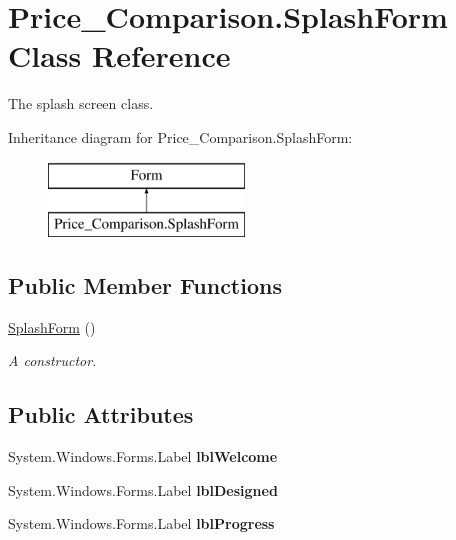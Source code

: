 \hypertarget{class_price___comparison_1_1_splash_form}{\section{Price\-\_\-\-Comparison.\-Splash\-Form Class Reference}
\label{class_price___comparison_1_1_splash_form}
}


The splash screen class.  


Inheritance diagram for Price\-\_\-\-Comparison.\-Splash\-Form\-:\begin{figure}[H]
\begin{center}
\leavevmode
\includegraphics[height=2.000000cm]{class_price___comparison_1_1_splash_form}
\end{center}
\end{figure}
\subsection*{Public Member Functions}
\begin{DoxyCompactItemize}
\item 
\hyperlink{class_price___comparison_1_1_splash_form_a401a198b0d83eb8f0cb23b44c28a7947}{Splash\-Form} ()
\begin{DoxyCompactList}\small\item\em A constructor. \end{DoxyCompactList}\end{DoxyCompactItemize}
\subsection*{Public Attributes}
\begin{DoxyCompactItemize}
\item 
\hypertarget{class_price___comparison_1_1_splash_form_a97a5ae7ed570ded7eb55579e87124858}{System.\-Windows.\-Forms.\-Label {\bfseries lbl\-Welcome}}\label{class_price___comparison_1_1_splash_form_a97a5ae7ed570ded7eb55579e87124858}

\item 
\hypertarget{class_price___comparison_1_1_splash_form_a0f764d2db0810f337ebd6b403afaa211}{System.\-Windows.\-Forms.\-Label {\bfseries lbl\-Designed}}\label{class_price___comparison_1_1_splash_form_a0f764d2db0810f337ebd6b403afaa211}

\item 
\hypertarget{class_price___comparison_1_1_splash_form_a5ff93cdb98446eae7b7742236b129455}{System.\-Windows.\-Forms.\-Label {\bfseries lbl\-Progress}}\label{class_price___comparison_1_1_splash_form_a5ff93cdb98446eae7b7742236b129455}

\end{DoxyCompactItemize}
